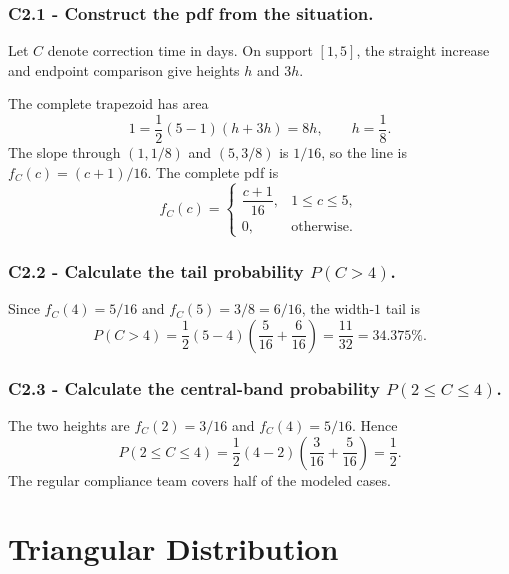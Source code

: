 \subsubsection*{C2.1 - Construct the pdf from the situation.}
\label{subsec:c2-linear-customs-a}
Let $C$ denote correction time in days.  On support $[1,5]$, the straight
increase and endpoint comparison give heights $h$ and $3h$.

The complete
trapezoid has area
\[
 1=\frac12(5-1)(h+3h)=8h,\qquad h=\frac18.
\]
The slope through $(1,1/8)$ and $(5,3/8)$ is $1/16$, so the line is
$f_C(c)=(c+1)/16$.  The complete pdf is
\[
 f_C(c)=\begin{cases}\dfrac{c+1}{16},&1\le c\le5,\\[2mm]0,&\text{otherwise.}\end{cases}
\]

\subsubsection*{C2.2 - Calculate the tail probability $P(C>4)$.}
\label{subsec:c2-linear-customs-b}
Since $f_C(4)=5/16$ and $f_C(5)=3/8=6/16$, the width-$1$ tail is
\[
 P(C>4)=\frac12(5-4)\left(\frac5{16}+\frac6{16}\right)=\frac{11}{32}
 =34.375\%.
\]

\subsubsection*{C2.3 - Calculate the central-band probability
$P(2\le C\le4)$.}
\label{subsec:c2-linear-customs-c}
The two heights are $f_C(2)=3/16$ and $f_C(4)=5/16$.  Hence
\[
 P(2\le C\le4)=\frac12(4-2)\left(\frac3{16}+\frac5{16}\right)=\frac12.
\]
The regular compliance team covers half of the modeled cases.

\section{Triangular Distribution}\label{sec:c2-triangular-practice}

